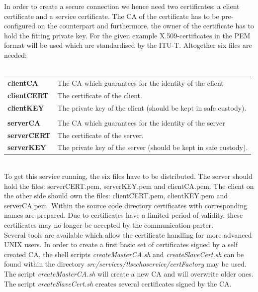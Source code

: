 In order to create a secure connection we hence need two certificates: a client certificate and a service certificate.
The CA of the certificate has to be pre-configured on the counterpart and furthermore, the owner of the certificate has to hold the fitting private key.
For the given example X.509-certificates in the PEM format will be used which are standardised by the ITU-T.
Altogether six files are needed:\\
\\
\begin{tabular}{l@{~---~}p{13cm}}
\textbf{clientCA}   & The CA which guarantees for the identity of the client \\
\textbf{clientCERT} & The certificate of the client. \\
\textbf{clientKEY}  & The private key of the client (should be kept in safe custody).\\
\\
\textbf{serverCA}   & The CA which guarantees for the identity of the server \\
\textbf{serverCERT} & The certificate of the server. \\
\textbf{serverKEY}  & The private key of the server (should be kept in safe custody).\\
\end{tabular}
\forcelinebreak
\\






To get this service running, the six files have to be distributed. The server should hold the files: serverCERT.pem, serverKEY.pem and clientCA.pem. The client on the other side should own the files: clientCERT.pem, clientKEY.pem and serverCA.pem.
Within the source code directory certificates with corresponding names are prepared. Due to certificates have a limited period of validity, these certificates may no longer be accepted by the communication parter.\\




Several tools are available which allow the certificate handling for more advanced UNIX users.
In order to create a first basic set of certificates signed by a self created CA, the shell scripts \textit{createMasterCA.sh} and \textit{createSlaveCert.sh} can  be found within the directory \textit{src/services/tlsechoservice/certFactory} may be used. The script \textit{createMasterCA.sh} will create a new CA and will overwrite older ones. The script \textit{createSlaveCert.sh} creates several certificates signed by the CA.\\


